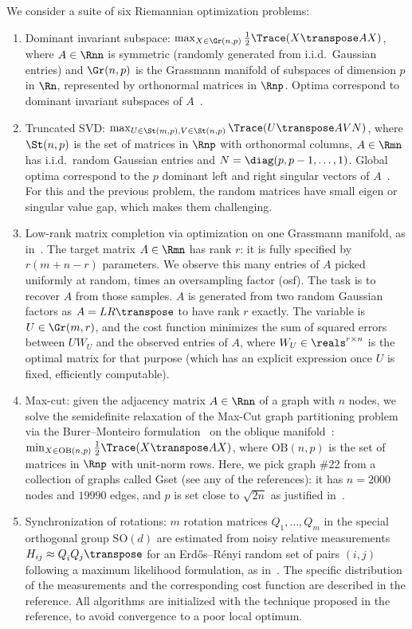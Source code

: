 We consider a suite of six Riemannian optimization problems:
\begin{enumerate}
	\item Dominant invariant subspace: $\max_{X \in \Gr(n, p)} \frac{1}{2} \Trace(X\transpose A X)$, where $A \in \Rnn$ is symmetric (randomly generated from i.i.d.\ Gaussian entries) and $\Gr(n, p)$ is the Grassmann manifold of subspaces of dimension $p$ in $\Rn$, represented by orthonormal matrices in $\Rnp$. Optima correspond to dominant invariant subspaces of $A$~\citep{edelman1998geometry}.
	\item Truncated SVD: $\max_{U\in\St(m, p), V\in\St(n, p)} \Trace(U\transpose A V N)$, where $\St(n, p)$ is the set of matrices in $\Rnp$ with orthonormal columns, $A \in \Rmn$ has i.i.d.\ random Gaussian entries and $N = \diag(p, p-1, \ldots, 1)$. Global optima correspond to the $p$ dominant left and right singular vectors of $A$~\citep{sato2013riemannianSVD}. For this and the previous problem, the random matrices have small eigen or singular value gap, which makes them challenging.
	\item Low-rank matrix completion via optimization on one Grassmann manifold, as in~\citep{boumal2011rtrmc}. The target matrix $A \in \Rmn$ has rank $r$: it is fully specified by $r(m+n-r)$ parameters. We observe this many entries of $A$ picked uniformly at random, times an oversampling factor (osf). The task is to recover $A$ from those samples. $A$ is generated from two random Gaussian factors as $A = LR\transpose$ to have rank $r$ exactly. The variable is $U \in \Gr(m, r)$, and the cost function minimizes the sum of squared errors between $UW_U$ and the observed entries of $A$, where $W_U \in \reals^{r \times n}$ is the optimal matrix for that purpose (which has an explicit expression once $U$ is fixed, efficiently computable).
	\item Max-cut: given the adjacency matrix $A \in \Rnn$ of a graph with $n$ nodes, we solve the semidefinite relaxation of the Max-Cut graph partitioning problem via the Burer--Monteiro formulation~\citep{burer2005local} on the oblique manifold~\citep{journee2010low}: $\min_{X\in\mathrm{OB}(n, p)} \frac{1}{2}\Trace(X\transpose A X)$, where $\mathrm{OB}(n, p)$ is the set of matrices in $\Rnp$ with unit-norm rows. Here, we pick graph \#22 from a collection of graphs called Gset (see any of the references): it has $n = 2000$ nodes and $19990$ edges, and $p$ is set close to $\sqrt{2n}$ as justified in~\citep{boumal2018deterministicbm}.
	\item Synchronization of rotations: $m$ rotation matrices $Q_1, \ldots, Q_m$ in the special orthogonal group $\mathrm{SO}(d)$ are estimated from noisy relative measurements $H_{ij} \approx Q_i^{}Q_j\transpose$ for an Erd\H{o}s--R\'enyi random set of pairs $(i, j)$ following a maximum likelihood formulation, as in~\citep{boumal2013MLE}. The specific distribution of the measurements and the corresponding cost function are described in the reference. All algorithms are initialized with the technique proposed in the reference, to avoid convergence to a poor local optimum.

\end{enumerate}
